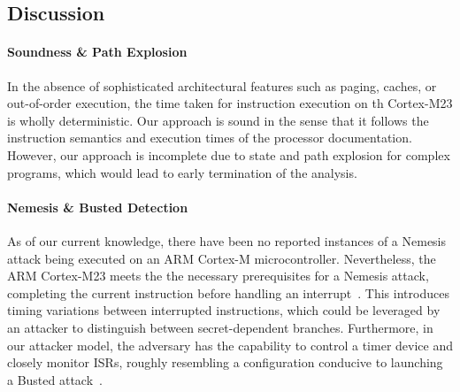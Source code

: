 \subsection{Discussion}

\paragraph{\textbf{Soundness \& Path Explosion}}
%
In the absence of
sophisticated architectural features such as paging, caches, or
out-of-order execution, the time taken for instruction
execution on th Cortex-M23 is wholly deterministic. Our approach is sound
in the sense that it follows the instruction semantics and execution times
of the processor documentation. However, our approach is incomplete due to
state and path explosion for complex programs, which would lead to early
termination of the analysis.

\paragraph{\textbf{Nemesis \& Busted Detection}}
%
As of our current knowledge, there have been no reported instances of a
Nemesis attack being executed on an ARM Cortex-M microcontroller.
Nevertheless, the ARM Cortex-M23 meets the 
the necessary prerequisites for a Nemesis attack,
completing the current instruction before
handling an interrupt~\cite{Nemesis}. This  introduces timing variations between
interrupted instructions, which could be leveraged by an attacker to
distinguish between secret-dependent branches. Furthermore, in our attacker
model, the adversary has the capability to control a timer device and
closely monitor \acp{ISR}, roughly resembling a configuration conducive to
launching a Busted attack~\cite{busted}.

% 

